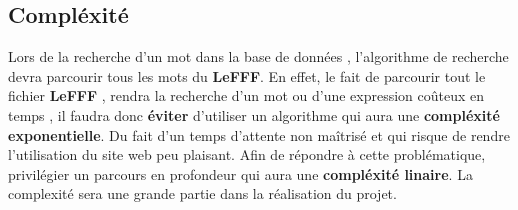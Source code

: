 \subsection{Compléxité}
Lors de la recherche d'un mot dans la base de données , l'algorithme de recherche devra parcourir tous les mots du \textbf{LeFFF}. En effet, le fait de parcourir tout le fichier \textbf{LeFFF} , rendra la recherche d'un mot ou d'une expression coûteux en temps , il faudra donc \textbf{éviter} d'utiliser  un algorithme qui aura une \textbf{compléxité exponentielle}. Du fait d'un temps d'attente non maîtrisé et qui risque de rendre l'utilisation du site web peu plaisant. Afin de répondre à cette problématique, privilégier un parcours en profondeur qui aura une \textbf{compléxité linaire}.
La complexité sera une grande partie dans la réalisation du projet.

